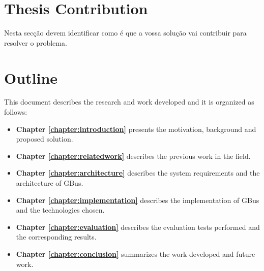 \section{Thesis Contribution}
\label{section:contribution}
Nesta secção devem identificar como é que a vossa solução vai contribuir para
resolver o problema.

\section{Outline}
This document describes the research and work developed and it is organized as follows:

\begin{itemize}
\item \textbf{Chapter \ref{chapter:introduction}} presents the motivation, background and proposed solution.
\item \textbf{Chapter \ref{chapter:relatedwork}} describes the previous work in the field.
\item \textbf{Chapter \ref{chapter:architecture}} describes the system requirements and the architecture of GBus.
\item \textbf{Chapter \ref{chapter:implementation}} describes the implementation of GBus and the technologies chosen.
\item \textbf{Chapter \ref{chapter:evaluation}} describes the evaluation tests performed and the corresponding results.
\item \textbf{Chapter \ref{chapter:conclusion}} summarizes the work developed and future work.
\end{itemize}

\cleardoublepage
